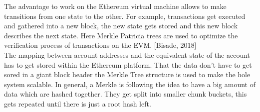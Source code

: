The advantage to work on the Ethereum virtual machine allows to make transitions from one state to the other. For example, transactions get executed and gathered into a new block, the new state gets stored and this new block describes the next state. Here Merkle Patricia trees are used to optimize the verification process of transactions on the EVM. [Bisade, 2018]
\\
The mapping between account addresses and the equivalent state of the account has to get stored within the Ethereum platform. That the data don’t have to get sored in a giant block header the Merkle Tree structure is used to make the hole system scalable. In general, a Merkle is following the idea to have a big amount of data which are hashed together. They get split into smaller chunk buckets, this gets repeated until there is just a root hash left. \cite{Butin 2015}

